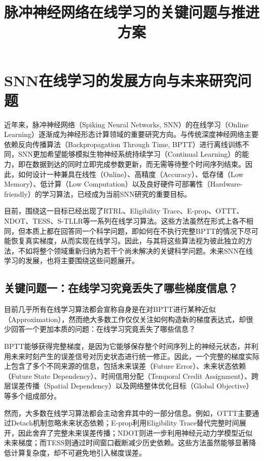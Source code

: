 \documentclass[11pt]{ctexart}
\title{脉冲神经网络在线学习的关键问题与推进方案}
\author{}
\date{}
\begin{document}
\maketitle

\section{SNN在线学习的发展方向与未来研究问题}

近年来，脉冲神经网络（Spiking Neural Networks, SNN）的在线学习（Online Learning）逐渐成为神经形态计算领域的重要研究方向。与传统深度神经网络主要依赖反向传播算法（Backpropagation Through Time, BPTT）进行离线训练不同，SNN更加希望能够模拟生物神经系统持续学习（Continual Learning）的能力，即在数据到达的同时立即完成参数更新，而无需等待整个时间序列结束。因此，如何设计一种兼具在线性（Online）、高精度（Accuracy）、低存储（Low Memory）、低计算（Low Computation）以及良好硬件可部署性（Hardware-friendly）的学习算法，已经成为当前SNN研究的重要目标。

目前，围绕这一目标已经出现了RTRL、Eligibility Trace、E-prop、OTTT、NDOT、TESS、S-TLLR等一系列在线学习算法。这些方法虽然在形式上各不相同，但本质上都在回答同一个科学问题，即如何在不执行完整BPTT的情况下尽可能恢复真实梯度，从而实现在线学习。因此，与其将这些算法视为彼此独立的方法，不如将整个领域重新归纳为若干个尚未解决的关键科学问题。未来SNN在线学习的发展，也将主要围绕这些问题展开。


\subsection{关键问题一：在线学习究竟丢失了哪些梯度信息？}

目前几乎所有在线学习算法都会宣称自身是在对BPTT进行某种近似（Approximation），然而绝大多数工作仅仅关注如何构造新的梯度表达式，却很少回答一个更加本质的问题：在线学习究竟丢失了哪些信息？

BPTT能够获得完整梯度，是因为它能够保存整个时间序列上的神经元状态，并利用未来时刻产生的误差信号对历史状态进行统一修正。因此，一个完整的梯度实际上包含了多个不同来源的信息，包括未来误差（Future Error）、未来状态依赖（Future State Dependency）、时间信用分配（Temporal Credit Assignment）、跨层误差传播（Spatial Dependency）以及网络整体优化目标（Global Objective）等多个组成部分。

然而，大多数在线学习算法都会主动舍弃其中的一部分信息。例如，OTTT主要通过Detach机制忽略未来状态依赖；E-prop利用Eligibility Trace替代完整时间展开，因此舍弃了完整未来误差传播；NDOT则进一步利用神经元动力学模型近似未来梯度；而TESS则通过时间窗口截断减少历史依赖。这些方法虽然能够显著降低计算复杂度，却不可避免地引入梯度误差。
\end{document}

